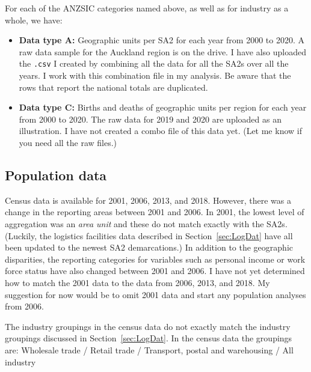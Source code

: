 \documentclass[3p, a4paper, authoryear, 11pt, fleqn, review]{elsarticle}
\begin{document}
\noindent
For each of the ANZSIC categories named above, as well as for industry as a whole, we have:
\begin{itemize}
\item \textbf{Data type A:} Geographic units per \ac{SA2} for each year from 2000 to 2020. A raw data sample for the Auckland region is on the drive. I have also uploaded the \texttt{.csv} I created by combining all the data for all the \acp{SA2} over all the years. I work with this combination file in my analysis. Be aware that the rows that report the national totals are duplicated. 
\item \textbf{Data type C:} Births and deaths of geographic units per region for each year from 2000 to 2020. The raw data for 2019 and 2020 are uploaded as an illustration. I have not created a combo file of this data yet. (Let me know if you need all the raw files.)
\end{itemize}


\subsection{Population data}
Census data is available for 2001, 2006, 2013, and 2018. However, there was a change in the reporting areas between 2001 and 2006. In 2001, the lowest level of aggregation was an \emph{area unit} and these do not match exactly with the \acp{SA2}. (Luckily, the logistics facilities data described in Section~\ref{sec:LogDat} have all been updated to the newest \ac{SA2} demarcations.) In addition to the geographic disparities, the reporting categories for variables such as personal income or work force status have also changed between 2001 and 2006. I have not yet determined how to match the 2001 data to the data from 2006, 2013, and 2018. My suggestion for now would be to omit 2001 data and start any population analyses from 2006. 

The industry groupings in the census data do not exactly match the industry groupings discussed in Section~\ref{sec:LogDat}. In the census data the groupings are: Wholesale trade / Retail trade / Transport, postal and warehousing / All industry
\end{document}

